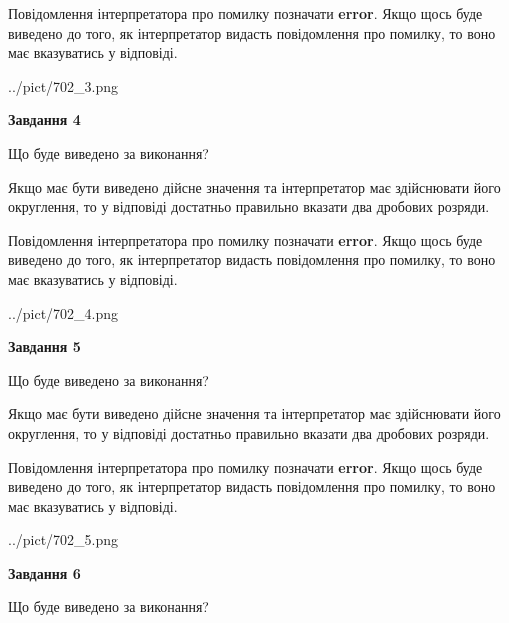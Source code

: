 \documentclass[12pt, ukrainian]{article}
\begin{document}
{\begin {Large}
Повідомлення інтерпретатора про помилку позначати \textbf{error}.
Якщо щось буде виведено до того, як інтерпретатор видасть повідомлення про помилку, 
то воно має вказуватись у відповіді. \par

\begin{center}
	{../pict/702_3.png}
\end{center}
\newpage

{\begin {center}\textbf{Завдання 4}\end {center}}\par
Що буде виведено за виконання? \par

Якщо має бути виведено дійсне значення та інтерпретатор має здійснювати його округлення, 
то у відповіді достатньо правильно вказати два дробових розряди.

Повідомлення інтерпретатора про помилку позначати \textbf{error}.
Якщо щось буде виведено до того, як інтерпретатор видасть повідомлення про помилку, 
то воно має вказуватись у відповіді. \par

\begin{center}
	{../pict/702_4.png}
\end{center}
\newpage

{\begin {center}\textbf{Завдання 5}\end {center}}\par
Що буде виведено за виконання? \par

Якщо має бути виведено дійсне значення та інтерпретатор має здійснювати його округлення, 
то у відповіді достатньо правильно вказати два дробових розряди.

Повідомлення інтерпретатора про помилку позначати \textbf{error}.
Якщо щось буде виведено до того, як інтерпретатор видасть повідомлення про помилку, 
то воно має вказуватись у відповіді. \par

\begin{center}
	{../pict/702_5.png}
\end{center}
\newpage

{\begin {center}\textbf{Завдання 6}\end {center}}\par
Що буде виведено за виконання? \par


\end{Large}}
\end{document}
